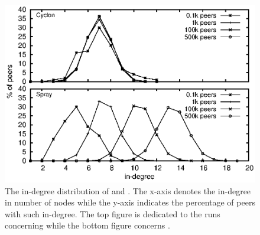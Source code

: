 \begin{figure}
  \centering
  \includegraphics[width=.8\textwidth]{img/spray/histo.eps}
  \caption{\label{fig:spray:histo}The in-degree distribution of \CYCLON and
    \SPRAY. The x-axis denotes the in-degree in number of nodes while the
    y-axis indicates the percentage of peers with such in-degree. The top
    figure is dedicated to the runs concerning \CYCLON while the bottom figure
    concerns \SPRAY.}
\end{figure}

\ \\


